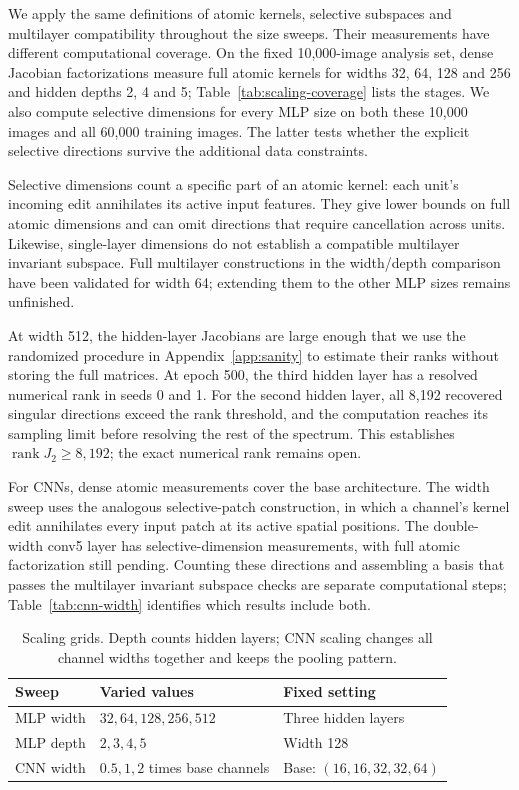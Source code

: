 We apply the same definitions of atomic kernels, selective subspaces and multilayer compatibility throughout the size sweeps. Their measurements have different computational coverage. On the fixed 10,000-image analysis set, dense Jacobian factorizations measure full atomic kernels for widths 32, 64, 128 and 256 and hidden depths 2, 4 and 5; Table~\ref{tab:scaling-coverage} lists the stages. We also compute selective dimensions for every MLP size on both these 10,000 images and all 60,000 training images. The latter tests whether the explicit selective directions survive the additional data constraints.

Selective dimensions count a specific part of an atomic kernel: each unit's incoming edit annihilates its active input features. They give lower bounds on full atomic dimensions and can omit directions that require cancellation across units. Likewise, single-layer dimensions do not establish a compatible multilayer invariant subspace. Full multilayer constructions in the width/depth comparison have been validated for width 64; extending them to the other MLP sizes remains unfinished.

At width 512, the hidden-layer Jacobians are large enough that we use the randomized procedure in Appendix~\ref{app:sanity} to estimate their ranks without storing the full matrices. At epoch 500, the third hidden layer has a resolved numerical rank in seeds 0 and 1. For the second hidden layer, all 8,192 recovered singular directions exceed the rank threshold, and the computation reaches its sampling limit before resolving the rest of the spectrum. This establishes $\operatorname{rank}J_2\ge8{,}192$; the exact numerical rank remains open.

For CNNs, dense atomic measurements cover the base architecture. The width sweep uses the analogous selective-patch construction, in which a channel's kernel edit annihilates every input patch at its active spatial positions. The double-width conv5 layer has selective-dimension measurements, with full atomic factorization still pending. Counting these directions and assembling a basis that passes the multilayer invariant subspace checks are separate computational steps; Table~\ref{tab:cnn-width} identifies which results include both.

\begin{table}[!htbp]\centering
\caption{Scaling grids. Depth counts hidden layers; CNN scaling changes all channel widths together and keeps the pooling pattern.}\label{tab:early-method-scaling}
\small\begin{tabular}{lll}\toprule
Sweep & Varied values & Fixed setting\\\midrule
MLP width & $32,64,128,256,512$ & Three hidden layers\\
MLP depth & $2,3,4,5$ & Width 128\\
CNN width & $0.5,1,2$ times base channels & Base: $(16,16,32,32,64)$\\\bottomrule
\end{tabular}
\end{table}

